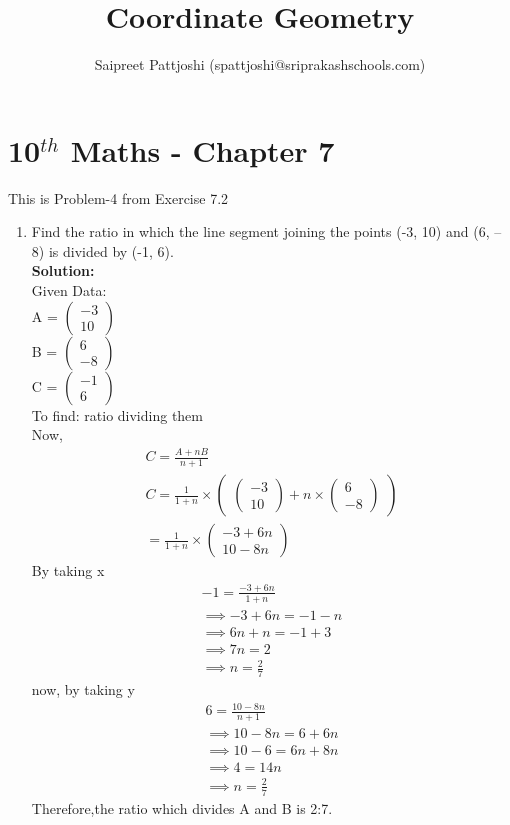 \documentclass[12pt]{article}
\title{Coordinate Geometry}
\author{Saipreet Pattjoshi (spattjoshi@sriprakashschools.com)}
\newcommand{\myvec}[1]{\ensuremath{\begin{pmatrix}#1\end{pmatrix}}}
\newcommand{\solution}{\noindent \textbf{Solution: }}
\begin{document}
\maketitle
\section*{10$^{th}$ Maths - Chapter 7}
This is Problem-4 from Exercise 7.2
\begin{enumerate}
\item  Find the ratio in which the line segment joining the points (-3, 10) and (6, – 8) is divided by (-1, 6).  \\
\solution \\
Given Data:\\
           A = \myvec{-3\\10}\\
           B = \myvec{6\\-8}\\
           C = \myvec{-1\\6}\\
To find: ratio dividing them\\
Now, 
\begin{align}
C = \frac{A+nB}{n+1}\\
C = \frac{1}{1+n} \times \myvec{\myvec{-3\\10}+n\times \myvec{6\\-8}}\\
= \frac{1}{1+n} \times \myvec{-3+6n\\10-8n}
\end{align}
By taking x
\begin{align}
-1= \frac{-3+6n}{1+n}\\
\implies -3+6n=-1-n\\
\implies 6n+n =-1+3\\
 \implies 7n=2\\
 \implies n=\frac{2}{7}
\end{align}	
now, by taking y 
\begin{align}
6= \frac{10-8n}{n+1}\\
\implies 10-8n=6+6n\\
\implies 10-6=6n+8n\\
\implies 4=14n\\
\implies n=\frac{2}{7}
\end{align}
Therefore,the ratio which divides A and B is 2:7.\\
\end{enumerate}
\end{document}
